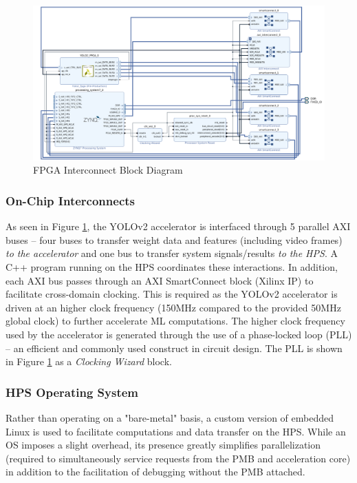 \begin{figure}[H]
\centering
\includegraphics[width=14cm]{img/fpga_interconnect.pdf}
\caption{FPGA Interconnect Block Diagram}
\label{interconnect}
\end{figure}

\subsubsection{On-Chip Interconnects}
As seen in Figure \ref{interconnect}, the YOLOv2 accelerator is interfaced through 5 parallel AXI buses -- four buses to transfer weight data and features (including video frames) \textit{to the accelerator} and one bus to transfer system signals/results \textit{to the HPS}. A C++ program running on the HPS coordinates these interactions. In addition, each AXI bus passes through an AXI SmartConnect block (Xilinx IP) to facilitate cross-domain clocking. This is required as the YOLOv2 accelerator is driven at an higher clock frequency (150MHz compared to the provided 50MHz global clock) to further accelerate ML computations. The higher clock frequency used by the accelerator is generated through the use of a phase-locked loop (PLL) -- an efficient and commonly used construct in circuit design. The PLL is shown in Figure \ref{interconnect} as a \textit{Clocking Wizard} block.

\subsubsection{HPS Operating System}
Rather than operating on a "bare-metal" basis, a custom version of embedded Linux is used to facilitate computations and data transfer on the HPS. While an OS imposes a slight overhead, its presence greatly simplifies parallelization (required to simultaneously service requests from the PMB and acceleration core) in addition to the facilitation of debugging without the PMB attached. 

